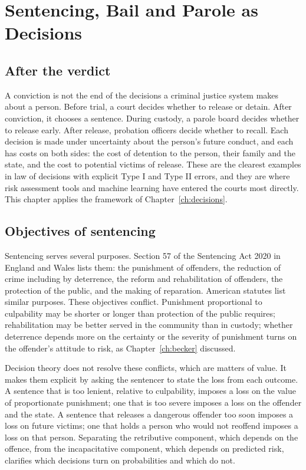 \chapter{Sentencing, Bail and Parole as Decisions}
\label{ch:sentencing}

\section{After the verdict}

A conviction is not the end of the decisions a criminal justice system makes about a person. Before trial, a court decides whether to release or detain. After conviction, it chooses a sentence. During custody, a parole board decides whether to release early. After release, probation officers decide whether to recall. Each decision is made under uncertainty about the person's future conduct, and each has costs on both sides: the cost of detention to the person, their family and the state, and the cost to potential victims of release. These are the clearest examples in law of decisions with explicit Type I and Type II errors, and they are where risk assessment tools and machine learning have entered the courts most directly. This chapter applies the framework of Chapter~\ref{ch:decisions}.

\section{Objectives of sentencing}

Sentencing serves several purposes. Section 57 of the Sentencing Act 2020 in England and Wales lists them: the punishment of offenders, the reduction of crime including by deterrence, the reform and rehabilitation of offenders, the protection of the public, and the making of reparation. American statutes list similar purposes. These objectives conflict. Punishment proportional to culpability may be shorter or longer than protection of the public requires; rehabilitation may be better served in the community than in custody; whether deterrence depends more on the certainty or the severity of punishment turns on the offender's attitude to risk, as Chapter~\ref{ch:becker} discussed.

Decision theory does not resolve these conflicts, which are matters of value. It makes them explicit by asking the sentencer to state the loss from each outcome. A sentence that is too lenient, relative to culpability, imposes a loss on the value of proportionate punishment; one that is too severe imposes a loss on the offender and the state. A sentence that releases a dangerous offender too soon imposes a loss on future victims; one that holds a person who would not reoffend imposes a loss on that person. Separating the retributive component, which depends on the offence, from the incapacitative component, which depends on predicted risk, clarifies which decisions turn on probabilities and which do not.


